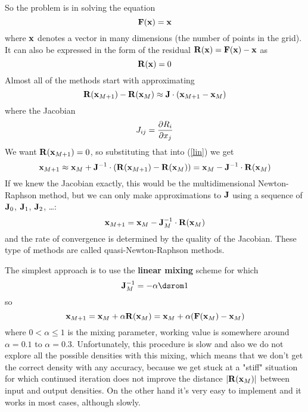 So the problem is in solving the equation 
\begin{equation*}
  {\bf F}({\bf x})={\bf x}
\end{equation*}
where ${\bf x}$ denotes a vector in many dimensions (the number of points in the grid). It can also be expressed in the form of the residual ${\bf R}({\bf x})={\bf F}({\bf x})-{\bf x}$ as 
\begin{equation*}
  {\bf R}({\bf x})=0
\end{equation*}
Almost all of the methods start with approximating 
\begin{equation}
  {\bf R}({\bf x}_{M+1})-{\bf R}({\bf x}_M)\approx{\bf J}\cdot({\bf x}_{M+1}-{\bf x}_M)  \label{lin}
\end{equation}
where the Jacobian 
\begin{equation*}
  J_{ij}={\partial R_i\over\partial x_j}
\end{equation*}
We want ${\bf R}({\bf x}_{M+1})=0$, so substituting that into (\ref{lin}) we get 
\begin{equation*}
  {\bf x}_{M+1}\approx{\bf x}_M+{\bf J}^{-1}\cdot({\bf R}({\bf x}_{M+1})-{\bf R}({\bf x}_M))= {\bf x}_M-{\bf J}^{-1}\cdot{\bf R}({\bf x}_M)
\end{equation*}
If we knew the Jacobian exactly, this would be the multidimensional Newton-Raphson method, but we can only make approximations to ${\bf J}$ using a sequence of ${\bf J}_0$, ${\bf J}_1$, ${\bf J}_2$, \dots: 
\begin{equation}
  {\bf x}_{M+1}={\bf x}_M-{\bf J}_M^{-1}\cdot{\bf R}({\bf x}_M)  \label{Jaciter}
\end{equation}
and the rate of convergence is determined by the quality of the Jacobian. These type of methods are called quasi-Newton-Raphson methods.

The simplest approach is to use the \textbf{linear mixing} scheme for which 
\begin{equation*}
  \J_M^{-1}=-\alpha\one
\end{equation*}
so 
\begin{equation*}
  {\bf x}_{M+1}={\bf x}_M+\alpha{\bf R}({\bf x}_M)={\bf x}_M+\alpha({\bf F}({\bf x}_M)-{\bf x}_M)
\end{equation*}
where $0<\alpha\le1$ is the mixing parameter, working value is somewhere around $\alpha=0.1$ to $\alpha=0.3$. Unfortunately, this procedure is slow and also we do not explore all the possible densities with this mixing, which means that we don't get the correct density with any accuracy, because we get stuck at a "stiff" situation for which continued iteration does not improve the distance $|{\bf R}({\bf x}_M)|$ between input and output densities. On the other hand it's very easy to implement and it works in most cases, although slowly.

